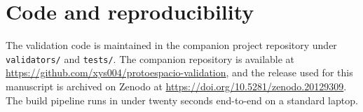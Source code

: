 \section*{Code and reproducibility}
The validation code is maintained in the companion project repository
under \texttt{validators/} and \texttt{tests/}. The companion repository
is available at \url{https://github.com/xys004/protoespacio-validation},
and the release used for this manuscript is archived on Zenodo at
\url{https://doi.org/10.5281/zenodo.20129309}. The build pipeline
runs in under twenty seconds end-to-end on a standard laptop.
